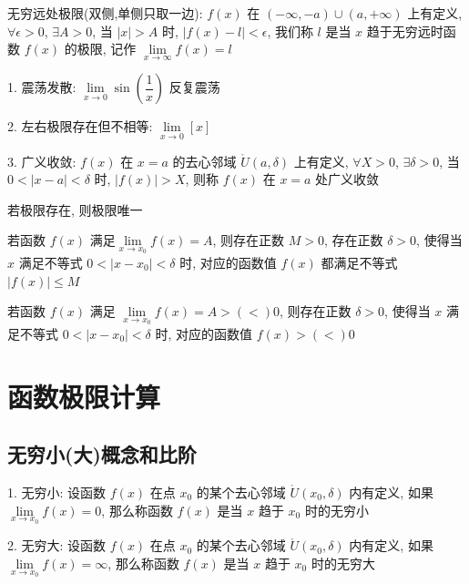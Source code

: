 \begin{definition}[无穷远极限]
	无穷远处极限(双侧,单侧只取一边): $f(x)$ 在 $(-\infty,-a)\cup(a,+\infty)$ 上有定义, $\forall \epsilon>0$, $\exists A>0$, 当 $|x|>A$ 时, $|f(x)-l|<\epsilon$, 我们称 $l$ 是当 $x$ 趋于无穷远时函数 $f(x)$ 的极限, 记作 $\lim\limits_{x\to\infty}f(x)=l$
\end{definition}
\begin{definition}[极限发散]
	1. 震荡发散: $\lim\limits_{x\to 0}\sin(\dfrac{1}{x})$ 反复震荡

	2. 左右极限存在但不相等: $\lim\limits_{x\to 0}[x]$

	3. 广义收敛: $f(x)$ 在 $x=a$ 的去心邻域 $\mathring{U}(a,\delta)$ 上有定义, $\forall X>0$, $\exists \delta>0$, 当 $0<|x-a|<\delta$ 时, $|f(x)|>X$, 则称 $f(x)$ 在 $x=a$ 处广义收敛
\end{definition}

\begin{property}[唯一性]
	若极限存在, 则极限唯一
\end{property}

\begin{property}[局部有界性]
	若函数 $f(x)$ 满足$\lim\limits_{x\to x_{0}}f(x)=A$, 则存在正数 $M>0$, 存在正数 $\delta>0$, 使得当 $x$ 满足不等式 $0<|x-x_{0}|<\delta$ 时, 对应的函数值 $f(x)$ 都满足不等式 $|f(x)|\leq M$
\end{property}

\begin{property}[局部保号性]
	若函数 $f(x)$ 满足 $\lim\limits_{x\to x_{0}}f(x)=A>(<)0$, 则存在正数 $\delta>0$, 使得当 $x$ 满足不等式 $0<|x-x_{0}|<\delta$ 时, 对应的函数值 $f(x)>(<)0$
\end{property}

\section{函数极限计算}
\subsection{无穷小(大)概念和比阶}
\begin{definition}[无穷小(大)]
	1. 无穷小: 设函数 $f(x)$ 在点 $x_{0}$ 的某个去心邻域 $\mathring{U}(x_{0},\delta)$ 内有定义, 如果 $\lim\limits_{x\to x_{0}}f(x)=0$, 那么称函数 $f(x)$ 是当 $x$ 趋于 $x_{0}$ 时的无穷小

	2. 无穷大: 设函数 $f(x)$ 在点 $x_{0}$ 的某个去心邻域 $\mathring{U}(x_{0},\delta)$ 内有定义, 如果 $\lim\limits_{x\to x_{0}}f(x)=\infty$, 那么称函数 $f(x)$ 是当 $x$ 趋于 $x_{0}$ 时的无穷大
\end{definition}

